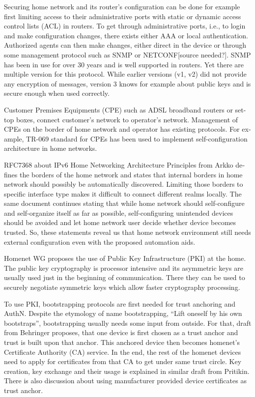 \documentclass[12pt,a4paper,english]{tutthesis}
\begin{document}
\begin{otherlanguage}{english}
Securing home network and its router's configuration can be done for
example first limiting access to their administrative ports
with static or dynamic access control lists (ACL) in
routers. To get through administrative ports, i.e., to login and make
configuration changes, there exists either AAA or local authentication.
Authorized agents can then make changes, either direct in the device or through some
management protocol such as SNMP or NETCONF[source needed?].  SNMP has been in
use for over 30 years and is well supported in routers. Yet there are
multiple version for this protocol. While earlier versions (v1, v2)
did not provide any encryption of messages, version 3 knows for example
about public keys and is secure enough when used correctly.


Customer Premises Equipments (CPE) such as ADSL broadband routers or
set-top boxes, connect customer's network to operator's network.
Management of CPEs on the border of home network and operator has 
existing protocols. For example, TR-069 standard\cite{iptvtr069} for CPEs
has been used to implement self-configuration archi\-tecture in
home networks\cite{tr069rachidi2011}.


RFC7368 about IPv6 Home Networking Architecture Principles from
Arkko\cite{rfc7368} defines the borders of the home network and states that
internal borders in home network should possibly be automatically
discovered. Limiting those borders to specific
interface type makes it difficult to connect different realms locally.
The same document continues stating
that while home network should self-configure and self-organize itself as
far as possible, self-configuring unintended devices should be
avoided and let home network user decide whether device becomes trusted.
So, these statements reveal us that home network environment still needs
external configuration even with the proposed automation aids.





Homenet WG proposes the use of Public Key Infrastructure (PKI) at the
home. The public key cryptography is processor intensive and its
asymmetric keys are usually used just in the beginning of
communication. There they can be used to securely negotiate symmetric
keys which allow faster cryptography processing.

To use PKI, bootstrapping protocols are first needed for trust
anchoring and AuthN.  Despite the etymology of name bootstrapping,
``Lift oneself by his own bootstraps'', bootstrapping usually needs
some input from outside.
For that, draft from Behringer\cite{draft-behringer-bootstrap} proposes,
that one device is first chosen as a trust anchor and trust is
built upon that anchor. This anchored device then becomes homenet's
Certificate Authority (CA) service. In the end, the rest of the homenet 
devices need to apply for certificates from that CA to get under same
trust circle.
Key creation, key exchange and their usage is explained in similar
draft from Pritikin\cite{draft-pritikin-bootstrap}. There is also discussion about using
manufacturer provided device certificates as trust anchor.  




\end{otherlanguage}
\end{document}
